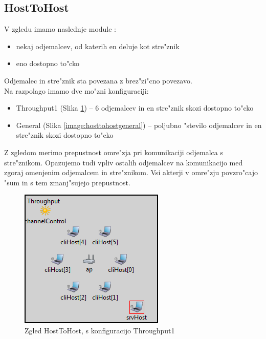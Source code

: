 \documentclass[a4paper,11pt]{article}
\begin{document}
\subsection{HostToHost}
V zgledu imamo naslednje module :

\begin{itemize}
    \item nekaj odjemalcev, od katerih en deluje kot stre"znik
    \item eno dostopno to"cko
\end{itemize}

Odjemalec in stre"znik sta povezana z brez"zi"cno povezavo.\\

Na razpolago imamo dve mo"zni konfiguraciji:

\begin{itemize}
    \item Throughput1 (Slika \ref{image:hosttohost}) – 6 odjemalcev in en stre"znik skozi dostopno to"cko
    \item General (Slika \ref{image:hosttohostgeneral}) – poljubno "stevilo odjemalcev in en stre"znik skozi dostopno to"cko
\end{itemize}

Z zgledom merimo prepustnost omre"zja pri komunikaciji odjemalca s stre"znikom. Opazujemo tudi vpliv ostalih odjemalcev na komunikacijo med zgoraj omenjenim odjemalcem in stre"znikom. Vsi akterji v omre"zju povzro"cajo "sum in s tem zmanj"sujejo prepustnost.


\begin{figure}[htbp]
    \begin{center}
        \includegraphics[scale=0.8]{img/zgledi/hosttohost.png}
        \caption{Zgled HostToHost, s konfiguracijo Throughput1}
        \label{image:hosttohost}
    \end{center}
\end{figure}
\end{document}
